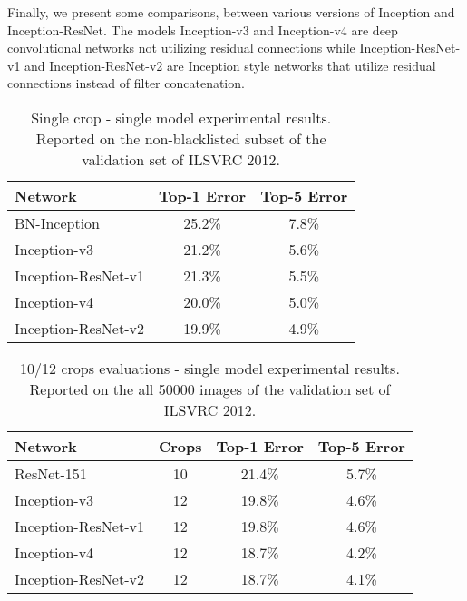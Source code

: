 \documentclass[10pt,twocolumn,letterpaper]{article}
\begin{document}
Finally, we present some comparisons, between various versions of Inception
and Inception-ResNet. The models Inception-v3 and Inception-v4 are deep
convolutional networks not utilizing residual connections while
Inception-ResNet-v1 and Inception-ResNet-v2 are Inception style networks
that utilize residual connections instead of filter concatenation.

\begin{table}{\small
 \begin{center}
   \begin{tabular}[H]{|l|c|c|}
   \hline
   {\bf Network} & {\bf Top-1 Error} & {\bf Top-5 Error} \\
   \hline
   BN-Inception~\cite{ioffe2015batch} & 25.2\% & 7.8\% \\
   Inception-v3~\cite{szegedy2015rethinking} & 21.2\% & 5.6\% \\
   Inception-ResNet-v1 & 21.3\% & 5.5\% \\
   Inception-v4 & 20.0\% & 5.0\% \\
   Inception-ResNet-v2 & 19.9\% & 4.9\% \\
   \hline
   \end{tabular}
 \end{center}
 }
\caption{Single crop - single model experimental results. Reported on the
non-blacklisted subset of the validation set of ILSVRC 2012.}
\label{singlesingle}
\end{table}\begin{table}{\small
 \begin{center}
   \begin{tabular}[H]{|l|c|c|c|}
   \hline
   {\bf Network} & {Crops} & {\bf Top-1 Error} & {\bf Top-5 Error} \\
   \hline
   ResNet-151~\cite{he2015deep} & 10 & 21.4\% & 5.7\% \\
   Inception-v3~\cite{szegedy2015rethinking} & 12 & 19.8\% & 4.6\% \\
   Inception-ResNet-v1 & 12 & 19.8\% & 4.6\% \\
   Inception-v4 & 12 & 18.7\% & 4.2\% \\
   Inception-ResNet-v2 & 12 & 18.7\% & 4.1\% \\
   \hline
   \end{tabular}
 \end{center}
 }
\caption{10/12 crops evaluations - single model experimental results.
  Reported on the
all 50000 images of the validation set of ILSVRC 2012.}
\label{multisingle}
\end{table}\begin{table}{\small
}
\end{table}
\end{document}
